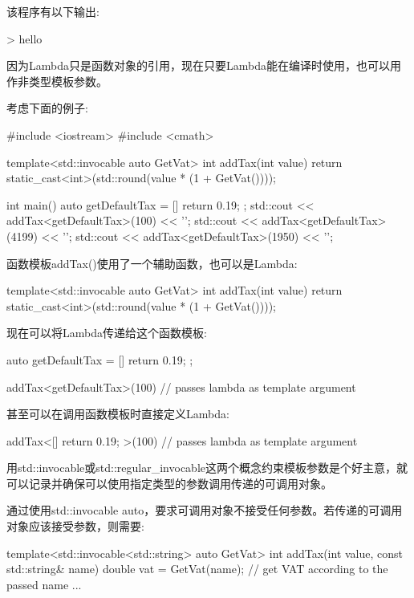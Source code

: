 该程序有以下输出:

\begin{shell}
> hello
\end{shell}


因为Lambda只是函数对象的引用，现在只要Lambda能在编译时使用，也可以用作非类型模板参数。

考虑下面的例子:


\begin{cpp}
#include <iostream>
#include <cmath>

template<std::invocable auto GetVat>
int addTax(int value)
{
	return static_cast<int>(std::round(value * (1 + GetVat())));
}

int main()
{
	auto getDefaultTax = [] {
		return 0.19;
	};
	std::cout << addTax<getDefaultTax>(100) << '\n';
	std::cout << addTax<getDefaultTax>(4199) << '\n';
	std::cout << addTax<getDefaultTax>(1950) << '\n';
}
\end{cpp}

函数模板addTax()使用了一个辅助函数，也可以是Lambda:

\begin{cpp}
template<std::invocable auto GetVat>
int addTax(int value)
{
	return static_cast<int>(std::round(value * (1 + GetVat())));
}
\end{cpp}

现在可以将Lambda传递给这个函数模板:

\begin{cpp}
auto getDefaultTax = [] {
	return 0.19;
};

addTax<getDefaultTax>(100) // passes lambda as template argument
\end{cpp}

甚至可以在调用函数模板时直接定义Lambda:

\begin{cpp}
addTax<[]{ return 0.19; }>(100) // passes lambda as template argument
\end{cpp}

用std::invocable或std::regular\_invocable这两个概念约束模板参数是个好主意，就可以记录并确保可以使用指定类型的参数调用传递的可调用对象。

通过使用std::invocable auto，要求可调用对象不接受任何参数。若传递的可调用对象应该接受参数，则需要:

\begin{cpp}
template<std::invocable<std::string> auto GetVat>
int addTax(int value, const std::string& name)
{
	double vat = GetVat(name); // get VAT according to the passed name
	...
}
\end{cpp}

